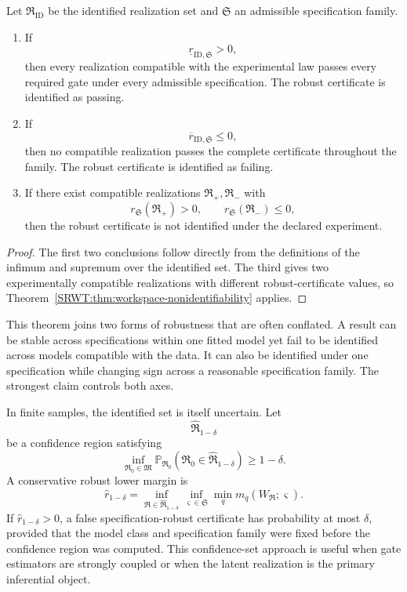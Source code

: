 
\begin{SRWTtheorem}
\label{SRWT:thm:joint-spec-identification}
Let \(\mathfrak R_{\mathrm{ID}}\) be the identified realization set and
\(\mathfrak S\) an admissible specification family.
\begin{enumerate}
\item If
\[
\boxed{
\underline r_{\mathrm{ID},\mathfrak S}>0,
}
\]
then every realization compatible with the experimental law passes every
required gate under every admissible specification. The robust certificate is
identified as passing.
\item If
\[
\boxed{
\overline r_{\mathrm{ID},\mathfrak S}\leq0,
}
\]
then no compatible realization passes the complete certificate throughout the
family. The robust certificate is identified as failing.
\item If there exist compatible realizations
\(\mathfrak R_+,\mathfrak R_-\) with
\[
r_{\mathfrak S}(\mathfrak R_+)>0,
\qquad
r_{\mathfrak S}(\mathfrak R_-)\leq0,
\]
then the robust certificate is not identified under the declared experiment.
\end{enumerate}
\end{SRWTtheorem}

\begin{proof}
The first two conclusions follow directly from the definitions of the infimum
and supremum over the identified set. The third gives two experimentally
compatible realizations with different robust-certificate values, so
Theorem~\ref{SRWT:thm:workspace-nonidentifiability} applies.
\end{proof}

This theorem joins two forms of robustness that are often conflated. A result
can be stable across specifications within one fitted model yet fail to be
identified across models compatible with the data. It can also be identified
under one specification while changing sign across a reasonable specification
family. The strongest claim controls both axes.


In finite samples, the identified set is itself uncertain. Let
\[
\widehat{\mathfrak R}_{1-\delta}
\]
be a confidence region satisfying
\[
\inf_{\mathfrak R_0\in\mathfrak M}
\mathbb P_{\mathfrak R_0}
\left(
\mathfrak R_0\in
\widehat{\mathfrak R}_{1-\delta}
\right)
\geq1-\delta.
\]
A conservative robust lower margin is
\[
\widehat r_{1-\delta}
=
\inf_{\mathfrak R\in\widehat{\mathfrak R}_{1-\delta}}
\inf_{\varsigma\in\mathfrak S}
\min_q m_q(W_{\mathfrak R};\varsigma).
\]
If \(\widehat r_{1-\delta}>0\), a false specification-robust certificate has
probability at most \(\delta\), provided that the model class and
specification family were fixed before the confidence region was computed.
This confidence-set approach is useful when gate estimators are strongly
coupled or when the latent realization is the primary inferential object.

